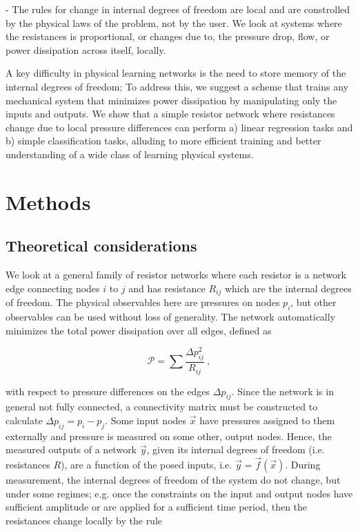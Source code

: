 \documentclass[%
 reprint,
 amsmath,amssymb,
 aps,
]{revtex4-2}
\begin{document}
    - The rules for change in internal degrees of freedom are local and are constrolled by the physical laws of the problem, not by the user. We look at systems where the resistances is proportional, or changes due to, the pressure drop, flow, or power dissipation across itself, locally. 

    A key difficulty in physical learning networks is the need to store memory of the internal degrees of freedom; To address this, we suggest a scheme that trains any mechanical system that minimizes power dissipation by manipulating only the inputs and outputs. We show that a simple resistor network where resistances change due to local pressure differences can perform a) linear regression tasks and b) simple classification tasks, alluding to more efficient training and better understanding of a wide class of learning physical systems.

\section{Methods}\label{sec:Methods}


\subsection{Theoretical considerations}\label{sec:theoretical}

    We look at a general family of resistor networks where each resistor is a network edge connecting nodes $i$ to $j$ and has resistance $R_{ij}$ which are the internal degrees of freedom. The physical observables here are pressures on nodes $p_i$, but other observables can be used without loss of generality. The network automatically minimizes the total power dissipation over all edges, defined as
    
    \begin{equation}\label{eq:power_dissipation}
        \mathcal{P}=\sum \frac{\Delta p_{ij}^2}{R_{ij}} \ ,
    \end{equation}

    with respect to pressure differences on the edges $\Delta p_{ij}$. Since the network is in general not fully connected, a connectivity matrix must be constructed to calculate $\Delta p_{ij}=p_i-p_j$. Some input nodes $\vec{x}$ have pressures assigned to them externally and pressure is measured on some other, output nodes. Hence, the measured outputs of a network $\vec{y}$, given its internal degrees of freedom (i.e. resistances $R$), are a function of the posed inputs, i.e. $\vec{y}=\vec{f}\left(\vec{x}\right)$.  During measurement, the internal degrees of freedom of the system do not change, but under some regimes; e.g. once the constraints on the input and output nodes have sufficient amplitude or are applied for a sufficient time period, then the resistances change locally by the rule
\end{document}
